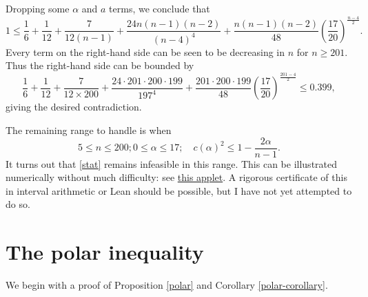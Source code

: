 \documentclass[12pt]{article}
\begin{document}
Dropping some $\alpha$ and $a$ terms, we conclude that
$$ 1 \leq \frac{1}{6} + \frac{1}{12} + \frac{7}{12(n-1)} + \frac{24 n (n-1) (n-2)}{(n-4)^4}
+ \frac{n (n-1) (n-2)}{48} (\frac{17}{20})^{\frac{n-4}{2}}.$$
Every term on the right-hand side can be seen to be decreasing in $n$ for $n \geq 201$.  Thus the right-hand side can be bounded by
$$ \frac{1}{6} + \frac{1}{12} + \frac{7}{12 \times 200} + \frac{24 \cdot 201 \cdot 200 \cdot 199}{197^4}
+ \frac{201 \cdot 200 \cdot 199}{48} (\frac{17}{20})^{\frac{201-4}{2}} \leq 0.399,$$
giving the desired contradiction.

The remaining range to handle is when
$$ 5 \leq n \leq 200; 0 \leq \alpha \leq 17; \quad c(\alpha)^2 \leq 1 - \frac{2\alpha}{n-1}.$$
It turns out that \eqref{stat} remains infeasible in this range.  This can be illustrated numerically without much difficulty: see \href{???}{this applet}.  A rigorous certificate of this in interval arithmetic or Lean should be possible, but I have not yet attempted to do so. 


\more

\section{The polar inequality}

We begin with a proof of Proposition \ref{polar} and Corollary \ref{polar-corollary}.
\end{document}
